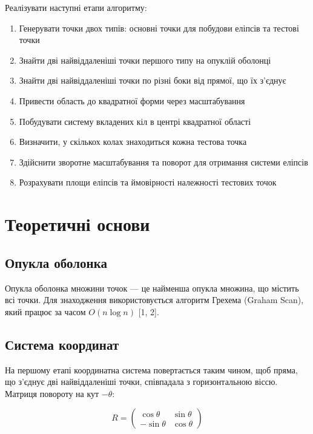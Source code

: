 \documentclass[12pt,a4paper]{article}
\begin{document}
Реалізувати наступні етапи алгоритму:

\begin{enumerate}
    \item Генерувати точки двох типів: основні точки для побудови еліпсів та тестові точки
    \item Знайти дві найвіддаленіші точки першого типу на опуклій оболонці
    \item Знайти дві найвіддаленіші точки по різні боки від прямої, що їх з'єднує
    \item Привести область до квадратної форми через масштабування
    \item Побудувати систему вкладених кіл в центрі квадратної області
    \item Визначити, у скількох колах знаходиться кожна тестова точка
    \item Здійснити зворотне масштабування та поворот для отримання системи еліпсів
    \item Розрахувати площи еліпсів та ймовірності належності тестових точок
\end{enumerate}

\section{Теоретичні основи}

\subsection{Опукла оболонка}

Опукла оболонка множини точок — це найменша опукла множина, що містить всі точки. Для знаходження використовується алгоритм Грехема (Graham Scan), який працює за часом $O(n \log n)$ [1, 2].

\subsection{Система координат}

На першому етапі координатна система повертається таким чином, щоб пряма, що з'єднує дві найвіддаленіші точки, співпадала з горизонтальною віссю. Матриця повороту на кут $-\theta$:

\begin{equation}
R = \begin{pmatrix} \cos\theta & \sin\theta \\ -\sin\theta & \cos\theta \end{pmatrix}
\end{equation}
\end{document}

